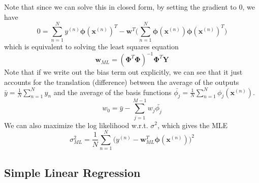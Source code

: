 \documentclass{article}
\theoremstyle{definition}
\theoremstyle{remark}
\theoremstyle{definition}
\begin{document}
Note that since we can solve this in closed form, by setting the gradient to $0$, we have 
\[0 = \sum_{n=1}^N y^{(n)} \boldsymbol{\phi}(\mathbf{x}^{(n)})^T - \mathbf{w}^T \bigg( \sum_{n=1}^N \boldsymbol{\phi}(\mathbf{x}^{(n)}) \boldsymbol{\phi}(\mathbf{x}^{(n)})^T \bigg)\]
which is equivalent to solving the least squares equation 
\[\mathbf{w}_{ML} = ( \boldsymbol{\Phi}^T \boldsymbol{\Phi})^{-1} \boldsymbol{\Phi}^T \mathbf{Y}\]
Note that if we write out the bias term out explicitly, we can see that it just accounts for the translation (difference) between the average of the outputs $\bar{y} = \frac{1}{N} \sum_{n=1}^N y_n$ and the average of the basis functions $\bar{\phi_j} = \frac{1}{N} \sum_{n=1}^N \phi_j (\mathbf{x}^{(n)})$. 
\[w_0 = \bar{y} - \sum_{j=1}^{M-1} w_j \bar{\phi_j}\]
We can also maximize the log likelihood w.r.t. $\sigma^2$, which gives the MLE 
\[\sigma^2_{ML} = \frac{1}{N} \sum_{n=1}^N \big( y^{(n)} - \mathbf{w}^T_{ML} \boldsymbol{\phi}(\mathbf{x}^{(n)}) \big)^2\]

\subsection{Simple Linear Regression}
\end{document}
